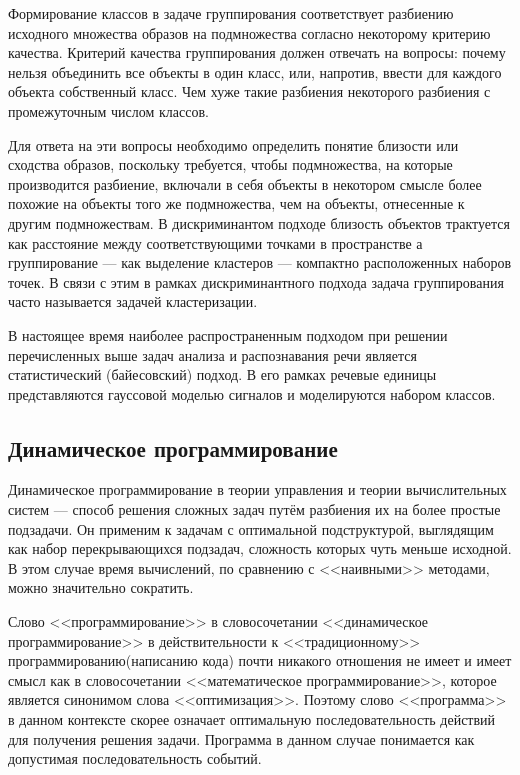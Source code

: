 \documentclass[a4paper,14pt,russian,utf8,nocolumnsxix,nocolumnxxxi,nocolumnxxxii]{eskdtext}
\begin{document}
Формирование классов в задаче группирования соответствует разбиению исходного множества образов на подмножества согласно некоторому критерию качества. Критерий качества группирования должен отвечать на вопросы: почему нельзя объединить все объекты в один класс, или, напротив, ввести для каждого объекта собственный класс. Чем хуже такие разбиения некоторого разбиения с промежуточным числом классов.

Для ответа на эти вопросы необходимо определить понятие близости или сходства образов, поскольку требуется, чтобы подмножества, на которые производится разбиение, включали в себя объекты в некотором смысле более похожие на объекты того же подмножества, чем на объекты, отнесенные к другим подмножествам. В дискриминантом подходе близость объектов трактуется как расстояние между соответствующими точками в пространстве а группирование — как выделение кластеров — компактно расположенных наборов точек. В связи с этим в рамках дискриминантного подхода задача группирования часто называется задачей кластеризации.

В настоящее время наиболее распространенным подходом при решении перечисленных выше задач анализа и распознавания речи является статистический (байесовский) подход. В его рамках речевые единицы представляются гауссовой моделью сигналов и моделируются набором классов.\cite{gub} 

\subsection{Динамическое программирование}

Динамическое программирование в теории управления и теории вычислительных систем — способ решения сложных задач путём разбиения их на более простые подзадачи. Он применим к задачам с оптимальной подструктурой, выглядящим как набор перекрывающихся подзадач, сложность которых чуть меньше исходной. В этом случае время вычислений, по сравнению с <<наивными>> методами, можно значительно сократить.

Слово <<программирование>> в словосочетании <<динамическое программирование>> в действительности к <<традиционному>> программированию(написанию кода) почти никакого отношения не имеет и имеет смысл как в словосочетании <<математическое программирование>>, которое является синонимом слова <<оптимизация>>. Поэтому слово <<программа>> в данном контексте скорее означает оптимальную последовательность действий для получения решения задачи. Программа в данном случае понимается как допустимая последовательность событий.
\end{document}
